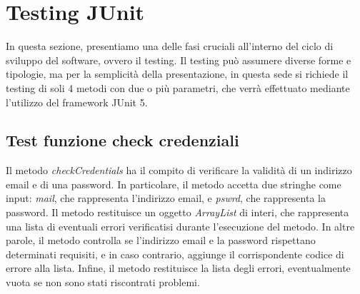 \section{Testing JUnit}

 

\begin{flushleft}

    In questa sezione, presentiamo una delle fasi cruciali all'interno del ciclo di sviluppo del software, ovvero il testing. 
    Il testing può assumere diverse forme e tipologie, ma per la semplicità della presentazione, in questa sede si richiede
    il testing di soli 4 metodi con due o più parametri, che verrà effettuato mediante l'utilizzo del framework JUnit 5.
\end{flushleft}



\subsection{Test funzione check credenziali}
\begin{flushleft}
    
    Il metodo \textit{checkCredentials} ha il compito di verificare la validità di un indirizzo email
     e di una password. In particolare, il metodo accetta due stringhe come input: \textit{mail}, che 
     rappresenta l'indirizzo email, e \textit{pswrd}, che rappresenta la password.
    Il metodo restituisce un oggetto \textit{ArrayList} di interi, che rappresenta una 
    lista di eventuali errori verificatisi durante l'esecuzione del metodo. In altre parole, 
    il metodo controlla se l'indirizzo email e la password rispettano determinati requisiti, 
    e in caso contrario, aggiunge il corrispondente codice di errore alla lista.
    Infine, il metodo restituisce la lista degli errori, eventualmente vuota se non sono stati riscontrati problemi.\\
\end{flushleft}

